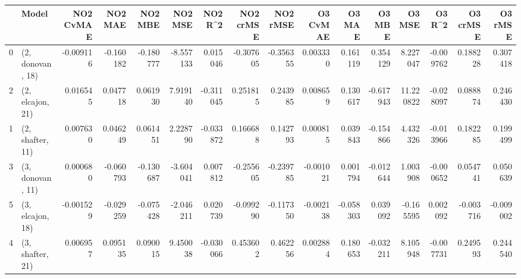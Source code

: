 \begin{tabular}{llrrrrrrrrrrrrrr}
\toprule
{} &             Model &  NO2 CvMAE &   NO2 MAE &   NO2 MBE &   NO2 MSE &   NO2 R\textasciicircum2 &  NO2 crMSE &  NO2 rMSE &  O3 CvMAE &    O3 MAE &    O3 MBE &     O3 MSE &    O3 R\textasciicircum2 &  O3 crMSE &   O3 rMSE \\
\midrule
0 &  (2, donovan, 18) &  -0.009116 & -0.160182 & -0.180777 & -8.557133 &  0.015046 &  -0.307605 & -0.356355 &  0.003330 &  0.161119 &  0.354129 &   8.227047 & -0.009762 &  0.188228 &  0.307418 \\
2 &  (2, elcajon, 21) &   0.016545 &  0.047718 &  0.061930 &  7.919140 & -0.311045 &   0.251815 &  0.243985 &  0.008659 &  0.130617 & -0.617943 &  11.220822 & -0.028097 &  0.088874 &  0.246430 \\
1 &  (2, shafter, 11) &   0.007630 &  0.046249 &  0.061451 &  2.228790 & -0.033872 &   0.166688 &  0.142793 &  0.000815 &  0.039843 & -0.154866 &   4.432326 & -0.013966 &  0.182285 &  0.199499 \\
3 &  (3, donovan, 11) &   0.000680 & -0.060793 & -0.130687 & -3.604041 &  0.007812 &  -0.255605 & -0.239785 & -0.001021 &  0.001794 & -0.012644 &   1.003908 & -0.000652 &  0.054741 &  0.050639 \\
5 &  (3, elcajon, 18) &  -0.001529 & -0.029259 & -0.075428 & -2.046211 &  0.020739 &  -0.099290 & -0.117350 & -0.002138 & -0.058303 &  0.039092 &  -0.165595 &  0.002092 & -0.003716 & -0.009002 \\
4 &  (3, shafter, 21) &   0.006957 &  0.095135 &  0.090015 &  9.450038 & -0.030066 &   0.453602 &  0.462256 &  0.002884 &  0.180653 & -0.032211 &   8.105948 & -0.007731 &  0.249593 &  0.244540 \\
\bottomrule
\end{tabular}
